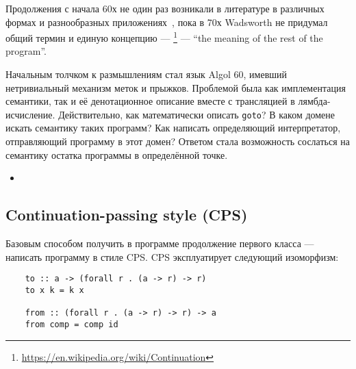 
Продолжения с начала 60х не один раз возникали в литературе в различных формах и разнообразных приложениях~\cite{reynolds1993discoveries, landin1997histories}, пока в 70х Wadsworth не придумал общий термин и единую концепцию --- \footnote{\url{https://en.wikipedia.org/wiki/Continuation}} --- ``the meaning of the rest of the program''.

Начальным толчком к размышлениям стал язык Algol 60, имевший нетривиальный механизм меток и прыжков.
Проблемой была как имплементация семантики, так и её денотационное описание вместе с трансляцией в лямбда-исчисление.
Действительно, как математически описать \texttt{goto}?
В каком домене искать семантику таких программ?
Как написать определяющий интерпретатор, отправляющий программу в этот домен?
Ответом стала возможность сослаться на семантику остатка программы в определённой точке.

\begin{itemize}
    \item
\end{itemize}













\subsection{Continuation-passing style (CPS)}

Базовым способом получить в программе продолжение первого класса --- написать программу в стиле CPS.
CPS эксплуатирует следующий изоморфизм:
\begin{verbatim}
    to :: a -> (forall r . (a -> r) -> r)
    to x k = k x

    from :: (forall r . (a -> r) -> r) -> a
    from comp = comp id
\end{verbatim}

